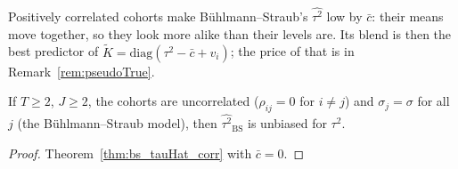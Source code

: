 \begin{remark}\label{rem:bs_tauHat_corr}
  Positively correlated cohorts make Bühlmann--Straub's $\widehat{\tau^2}$ low by $\bar c$:
  their means move together, so they look more alike than their levels are. Its blend is then
  the best predictor of $\tilde K = \mathrm{diag}(\tau^2 - \bar c + v_i)$; the price of that is in
  Remark~\ref{rem:pseudoTrue}.
\end{remark}

\begin{corollary}\label{cor:bs_tauHat}
  \leanok
  If $T \ge 2$, $J \ge 2$, the cohorts are uncorrelated ($\rho_{ij} = 0$ for $i \ne j$)
  and $\sigma_j = \sigma$ for all $j$ (the Bühlmann--Straub model), then
  $\widehat{\tau^2}_{\mathrm{BS}}$ is unbiased for $\tau^2$.
\end{corollary}
\begin{proof}
  \leanok
  Theorem~\ref{thm:bs_tauHat_corr} with $\bar c = 0$.
\end{proof}

